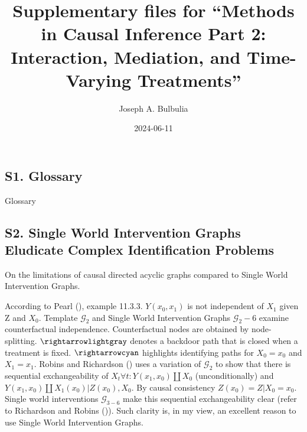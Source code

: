 \documentclass[
  single column]{article}
\title{Supplementary files for ``Methods in Causal Inference Part 2:
Interaction, Mediation, and Time-Varying Treatments''}
\author{Joseph A. Bulbulia}
\affil{%
             \small{     Victoria University of Wellington, New Zealand
          ORCID \textcolor[HTML]{A6CE39}{\aiOrcid} ~0000-0002-5861-2056 }
              }
\date{2024-06-11}
\renewcommand*\contentsname{Table of contents}
\newcommand\contentsname{Table of contents}
\begin{document}
\maketitle

\renewcommand*\contentsname{Table of contents}
{
\hypersetup{linkcolor=}
\setcounter{tocdepth}{2}
\tableofcontents
}
\listoftables
\newpage{}

\subsection{S1. Glossary}\label{id-app-a}

\begin{table}

\caption{\label{tbl-experiments}Glossary}

\centering{

\glossaryTerms

}

\end{table}%

\newpage{}

\subsection{S2. Single World Intervention Graphs Eludicate Complex
Identification Problems}\label{id-app-b}

\begin{table}

\caption{\label{tbl-pearltable}On the limitations of causal directed
acyclic graphs compared to Single World Intervention Graphs.}

\centering{

\pearltable

}

\end{table}%

According to Pearl (), example 11.3.3.
\(Y(x_0, x_1)\) is not independent of \(X_1\) given Z and \(X_0\).
Template \(\mathcal{G}_2\) and Single World Intervention Graphs
\(\mathcal{G}_2-6\) examine counterfactual independence. Counterfactual
nodes are obtained by node-splitting. \(\rightarrowlightgray\) denotes a
backdoor path that is closed when a treatment is fixed.
\(\rightarrowcyan\) highlights identifying paths for \(X_0 = x_0\) and
\(X_1 = x_1\). Robins and Richardson
() uses a variation of
\(\mathcal{G}_2\) to show that there is sequential exchangeability of
\(X_t \forall t: Y(x_1, x_0)\coprod X_0\) (unconditionally) and
\(Y(x_1, x_0)\coprod X_1(x_0) | Z(x_0), X_0\). By causal consistency
\(Z(x_0) = Z|X_0 = x_0\). Single world interventions
\(\mathcal{G}_{3-6}\) make this sequential exchangeability clear (refer
to Richardson and Robins ()). Such
clarity is, in my view, an excellent reason to use Single World
Intervention Graphs.
\end{document}
